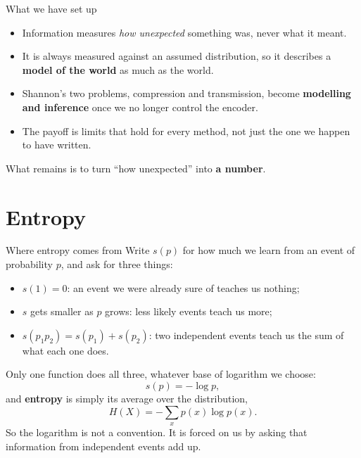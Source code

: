 \documentclass[aspectratio=169,9pt]{beamer}
\newcommand{\orange}[1]{\textcolor{AmazonOrange}{\textbf{#1}}}
\newcommand{\blue}[1]{\textcolor{densityblue}{\textbf{#1}}}
\newcommand{\muted}[1]{\textcolor{EPICMuted}{#1}}
\begin{document}
\begin{frame}{What we have set up}
\begin{itemize}
    \item Information measures \textit{how unexpected} something was, never what it meant.
    \pause
    \item It is always measured against an assumed distribution, so it describes a \blue{model of the world}
    as much as the world.
    \pause
    \item Shannon's two problems, compression and transmission, become \blue{modelling and inference} once
    we no longer control the encoder.
    \pause
    \item The payoff is limits that hold for every method, not just the one we happen to have written.
\end{itemize}
\vspace{0.4cm}
\pause
\begin{center}
\large What remains is to turn ``how unexpected'' into \orange{a number}.
\end{center}
\end{frame}

\section{Entropy}

\begin{frame}{Where entropy comes from}
Write $s(p)$ for how much we learn from an event of probability $p$, and ask for three things:
\begin{itemize}
    \item $s(1) = 0$: an event we were already sure of teaches us nothing;
    \item $s$ gets smaller as $p$ grows: less likely events teach us more;
    \item $s(p_1 p_2) = s(p_1) + s(p_2)$: two independent events teach us the sum of what each one does.
\end{itemize}
\pause
\vspace{0.2cm}
Only one function does all three, whatever base of logarithm we choose:
\[
    s(p) = -\log p ,
\]
\pause
and \orange{entropy} is simply its average over the distribution,
\[
    H(X) = -\sum_x p(x) \log p(x) .
\]
\vspace{0.1cm}
\pause
\muted{So the logarithm is not a convention. It is forced on us by asking that information from independent
events add up.}
\end{frame}
\end{document}
